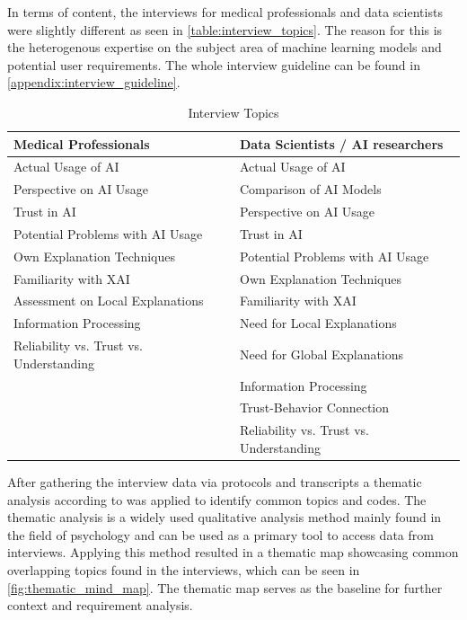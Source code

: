 \documentclass[11pt,a4paper,english]{scrreprt}
\begin{document}
In terms of content, the interviews for medical professionals and data scientists were slightly different as seen in \autoref{table:interview_topics}. The reason for this is the heterogenous expertise on the subject area of machine learning models and potential user requirements. The whole interview guideline can be found in \autoref{appendix:interview_guideline}.
\begin{table}[htbp]
    \centering
    \begin{tabularx}{\textwidth}{ l l }
        \toprule
        Medical Professionals & Data Scientists / AI researchers \\
        \midrule
        Actual Usage of AI & Actual Usage of AI \\ 
        Perspective on AI Usage & Comparison of AI Models \\  
        Trust in AI & Perspective on AI Usage \\
        Potential Problems with AI Usage & Trust in AI \\
        Own Explanation Techniques & Potential Problems with AI Usage \\
        Familiarity with XAI & Own Explanation Techniques \\
        Assessment on Local Explanations & Familiarity with XAI \\
        Information Processing & Need for Local Explanations \\
        Reliability vs. Trust vs. Understanding & Need for Global Explanations \\
         & Information Processing \\
         & Trust-Behavior Connection \\
         & Reliability vs. Trust vs. Understanding \\
        \bottomrule
    \end{tabularx}
    \caption{Interview Topics}
    \label{table:interview_topics}
\end{table}

After gathering the interview data via protocols and transcripts a thematic analysis according to \textcite{braun_thematical_2006} was applied to identify common topics and codes. The thematic analysis is a widely used qualitative analysis method mainly found in the field of psychology and can be used as a primary tool to access data from interviews. Applying this method resulted in a thematic map showcasing common overlapping topics found in the interviews, which can be seen in \autoref{fig:thematic_mind_map}. The thematic map serves as the baseline for further context and requirement analysis.
\end{document}
